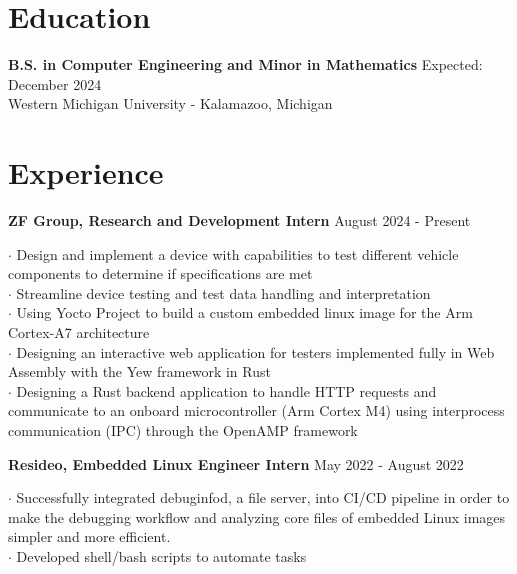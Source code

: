 \documentclass[letter,12pt]{article}
\begin{document}
\vspace{-0.50cm}
\section*{Education} 
\vspace{-.25cm}
\textbf{B.S. in Computer Engineering and Minor in Mathematics} 
\hfill Expected: December 2024\\
Western Michigan University - Kalamazoo, Michigan\\ 

\vspace{-1.0cm}
\section*{Experience} 
\begin{tcolorbox}
[colback=gray!25,
  leftrule=0pt,
  rightrule=0pt,
  sharp corners]
\textbf{ZF Group, Research and Development Intern} \hfill August 2024 - Present 
\end{tcolorbox}
\noindent$\cdot$ Design and implement a device with capabilities to test different vehicle components to determine if specifications are met\\
$\cdot$ Streamline device testing and test data handling and interpretation\\
$\cdot$ Using Yocto Project to build a custom embedded linux image for the Arm Cortex-A7 architecture \\
$\cdot$ Designing an interactive web application for testers implemented fully in Web Assembly with the Yew framework in Rust \\
$\cdot$ Designing a Rust backend application to handle HTTP requests and communicate to an onboard microcontroller (Arm Cortex M4)
using interprocess communication (IPC) through the OpenAMP framework\\
\vspace{-.5cm}
\begin{tcolorbox}
[colback=gray!25,
  leftrule=0pt,
  rightrule=0pt,
  sharp corners]
\noindent\textbf{Resideo, Embedded Linux
Engineer Intern} \hfill May 2022 - August 2022 
\end{tcolorbox}
\noindent$\cdot$ Successfully integrated
debuginfod, a file server, into CI/CD pipeline in order to make the debugging
workflow and analyzing core files of embedded Linux images simpler and more
efficient.\\
$\cdot$ Developed shell/bash scripts to automate tasks\\
\end{document}
